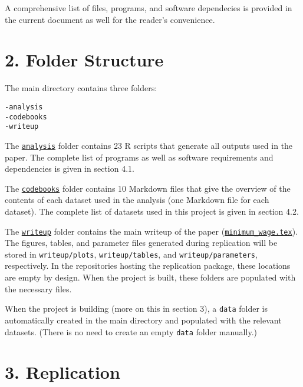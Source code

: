 \documentclass[10pt]{article}
\begin{document}
A comprehensive list of files, programs, and software dependecies is provided in the current document as well for the reader's convenience.

\vspace{1em}
\section*{2. Folder Structure}

The main directory contains three folders:
\begin{verbatim}
-analysis
-codebooks
-writeup
\end{verbatim}

The \href{https://www.github.com/johnjosephhorton/minimum_wage/blob/main/analysis}{\texttt{analysis}} folder contains 23 R scripts that generate all outputs used in the paper.
The complete list of programs as well as software requirements and dependencies is given in section 4.1.

The \href{https://www.github.com/johnjosephhorton/minimum_wage/blob/main/codebooks}{\texttt{codebooks}} folder contains 10 Markdown files that give the overview of the contents of each dataset used in the analysis (one Markdown file for each dataset).
The complete list of datasets used in this project is given in section 4.2.

The \href{https://www.github.com/johnjosephhorton/minimum_wage/blob/main/writeup}{\texttt{writeup}} folder contains the main writeup of the paper (\href{https://www.github.com/johnjosephhorton/minimum_wage/blob/main/writeup/minimum\_wage.tex}{\texttt{minimum\_wage.tex}}). 
The figures, tables, and parameter files generated during replication will be stored in \texttt{writeup/plots}, \texttt{writeup/tables}, and \texttt{writeup/parameters}, respectively.
In the repositories hosting the replication package, these locations are empty by design.
When the project is built, these folders are populated with the necessary files. 

When the project is building (more on this in section 3), a \texttt{data} folder is automatically created in the main directory and populated with the relevant datasets.
(There is no need to create an empty \texttt{data} folder manually.)

\vspace{1em}
\section*{3. Replication}
\end{document}
